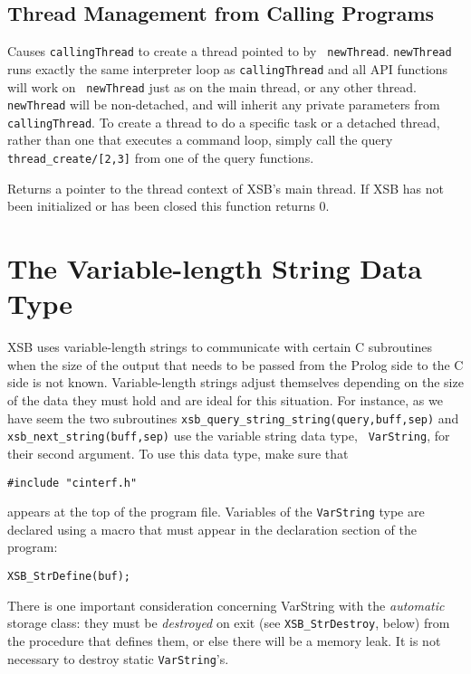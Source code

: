 \subsection{Thread Management from Calling Programs}

\begin{description}

%
Causes {\tt callingThread} to create a thread pointed to by {\tt
  newThread}.  {\tt newThread} runs exactly the same interpreter loop
as {\tt callingThread} and all API functions will work on {\tt
  newThread} just as on the main thread, or any other thread.  {\tt
  newThread} will be non-detached, and will inherit any private
parameters from {\tt callingThread}.  To create a thread to do a
specific task or a detached thread, rather than one that executes a
command loop, simply call the query {\tt thread\_create/[2,3]} from
one of the query functions.

%
Returns a pointer to the thread context of XSB's main thread.  If XSB
has not been initialized or has been closed this function returns 0.



\end{description}

\section{The Variable-length String Data Type}\label{sec-varstring}

 XSB uses variable-length strings to communicate with
certain C subroutines when the size of the output that needs to be passed
from the Prolog side to the C side is not known. Variable-length strings
adjust themselves depending on the size of the data they must hold and are
ideal for this situation. For instance, as we have seem the two subroutines
{\tt xsb\_query\_string\_string(query,buff,sep)} and {\tt
  xsb\_next\_string(buff,sep)} use the variable string data type, {\tt
  VarString}, for their second argument.  To use this data type, make sure
that
\begin{verbatim}
#include "cinterf.h"  
\end{verbatim}
appears at the top of the program file.  Variables of the {\tt VarString}
type are declared using a macro that must appear in the declaration section
of the program:
\begin{verbatim}
XSB_StrDefine(buf);  
\end{verbatim}
There is one important consideration concerning VarString with the
\emph{automatic} storage class: they must be
\emph{destroyed} on exit (see {\tt XSB\_StrDestroy}, below) from the procedure
that defines them, or else there will be a memory leak. 
It is not necessary to destroy static {\tt VarString}'s.

